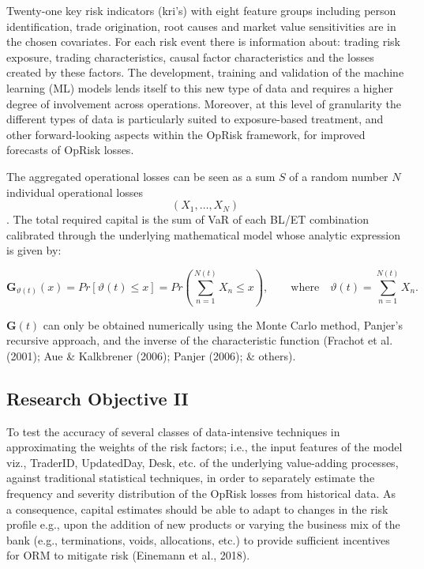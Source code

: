 \documentclass{DissertateUSU}
\begin{document}
Twenty-one key risk indicators (kri's) with eight feature groups
including person identification, trade origination, root causes and
market value sensitivities are in the chosen covariates. For each risk
event there is information about: trading risk exposure, trading
characteristics, causal factor characteristics and the losses created by
these factors. The development, training and validation of the machine
learning (ML) models lends itself to this new type of data and requires
a higher degree of involvement across operations. Moreover, at this
level of granularity the different types of data is particularly suited
to exposure-based treatment, and other forward-looking aspects within
the OpRisk framework, for improved forecasts of OpRisk losses.\medskip

The aggregated operational losses can be seen as a sum \(S\) of a random
number \(N\) individual operational losses \[(X_1, \ldots, X_N )\]. The
total required capital is the sum of VaR of each BL/ET combination
calibrated through the underlying mathematical model whose analytic
expression is given by:

\singlespacing

\begin{equation}\label{eqn4}
\mathbf{G}_{\vartheta(t)}(x)=Pr[\vartheta(t)\leq x]=Pr\left(\sum_{n=1}^{N(t)}X_{n} \leq x\right), \qquad \mbox{where} \quad \vartheta(t) = \sum_{n=1}^{N(t)} X_{n}.
\end{equation} \doublespacing

\(\mathbf{G}(t)\) can only be obtained numerically using the Monte Carlo
method, Panjer's recursive approach, and the inverse of the
characteristic function (Frachot et al. (2001); Aue \& Kalkbrener
(2006); Panjer (2006); \& others).

\subsection{Research Objective II}

To test the accuracy of several classes of data-intensive techniques in
approximating the weights of the risk factors; i.e., the input features
of the model viz., TraderID, UpdatedDay, Desk, etc. of the underlying
value-adding processes, against traditional statistical techniques, in
order to separately estimate the frequency and severity distribution of
the OpRisk losses from historical data. As a consequence, capital
estimates should be able to adapt to changes in the risk profile e.g.,
upon the addition of new products or varying the business mix of the
bank (e.g., terminations, voids, allocations, etc.) to provide
sufficient incentives for ORM to mitigate risk (Einemann et al., 2018).
\end{document}
